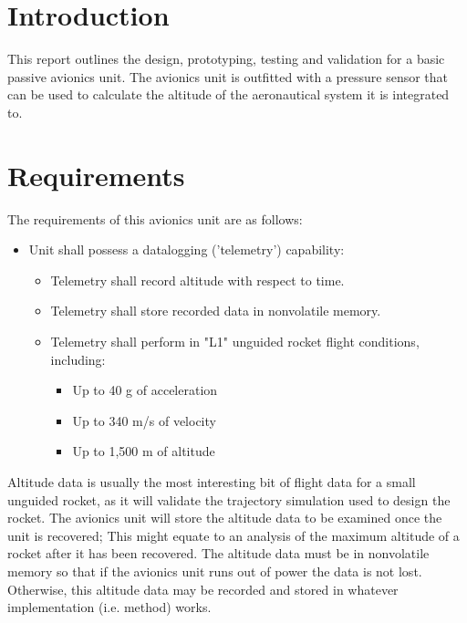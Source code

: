 \documentclass{article}
\begin{document}



\section{Introduction}

    This report outlines the design, prototyping, testing and validation for a basic passive avionics unit.
    The avionics unit is outfitted with a pressure sensor that can be used to calculate the altitude of the aeronautical system it is integrated to.

\section{Requirements}

    The requirements of this avionics unit are as follows:
    \begin{itemize}
        \item Unit shall possess a datalogging ('telemetry') capability:
        \begin{itemize}
            \item Telemetry shall record altitude with respect to time.
            \item Telemetry shall store recorded data in nonvolatile memory.
            \item Telemetry shall perform in "L1" unguided rocket flight conditions, including:
            \begin{itemize}
                \item Up to 40 g of acceleration
                \item Up to 340 m/s of velocity
                \item Up to 1,500 m of altitude
            \end{itemize}
        \end{itemize}
    \end{itemize}

    Altitude data is usually the most interesting bit of flight data for a small unguided rocket, as it will validate the trajectory simulation used to design the rocket.
    The avionics unit will store the altitude data to be examined once the unit is recovered;
    This might equate to an analysis of the maximum altitude of a rocket after it has been recovered.
    The altitude data must be in nonvolatile memory so that if the avionics unit runs out of power the data is not lost.
    Otherwise, this altitude data may be recorded and stored in whatever implementation (i.e. method) works.
\end{document}
